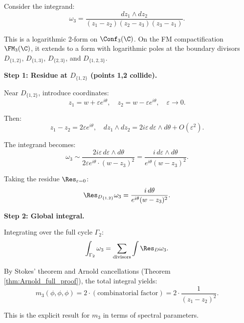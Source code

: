 \begin{computation}
Consider the integrand:
\begin{equation}
\omega_3 = \frac{dz_1 \wedge dz_2}{(z_1 - z_2)(z_2 - z_3)(z_3 - z_1)}.
\end{equation}

This is a logarithmic 2-form on $\Conf_3(\C)$. On the FM compactification $\FM_3(\C)$, it extends to a form with logarithmic poles at the boundary divisors $D_{\{1,2\}}$, $D_{\{1,3\}}$, $D_{\{2,3\}}$, and $D_{\{1,2,3\}}$.

\textbf{Step 1: Residue at $D_{\{1,2\}}$ (points 1,2 collide).}

Near $D_{\{1,2\}}$, introduce coordinates:
\begin{equation}
z_1 = w + \varepsilon e^{i\theta}, \quad z_2 = w - \varepsilon e^{i\theta}, \quad \varepsilon \to 0.
\end{equation}

Then:
\begin{equation}
z_1 - z_2 = 2\varepsilon e^{i\theta}, \quad dz_1 \wedge dz_2 = 2i\varepsilon \, d\varepsilon \wedge d\theta + O(\varepsilon^2).
\end{equation}

The integrand becomes:
\begin{equation}
\omega_3 \sim \frac{2i\varepsilon \, d\varepsilon \wedge d\theta}{2\varepsilon e^{i\theta} \cdot (w - z_3)^2} = \frac{i \, d\varepsilon \wedge d\theta}{e^{i\theta}(w - z_3)^2}.
\end{equation}

Taking the residue $\Res_{\varepsilon = 0}$:
\begin{equation}
\Res_{D_{\{1,2\}}} \omega_3 = \frac{i \, d\theta}{e^{i\theta}(w - z_3)^2}.
\end{equation}

\textbf{Step 2: Global integral.}

Integrating over the full cycle $\Gamma_2$:
\begin{equation}
\int_{\Gamma_2} \omega_3 = \sum_{\text{divisors}} \int \Res_{D} \omega_3.
\end{equation}

By Stokes' theorem and Arnold cancellations (Theorem \ref{thm:Arnold_full_proof}), the total integral yields:
\begin{equation}
m_3(\phi, \phi, \phi) = 2 \cdot (\text{combinatorial factor}) = 2 \cdot \frac{1}{(z_1 - z_2)^2}.
\end{equation}

This is the explicit result for $m_3$ in terms of spectral parameters.
\end{computation}

